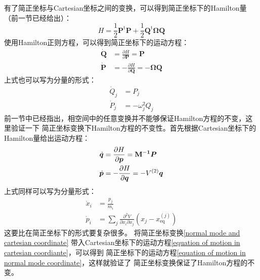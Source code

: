    \splitline

    有了简正坐标与Cartesian坐标之间的变换，可以得到简正坐标下的Hamilton量（前一节已经给出）：
    \begin{equation}
        H = \frac 12 \bm{P}^\mathrm{t}\bm{P} + \frac 12 \bm{Q}^\mathrm{t} \bm{\Omega Q}
    \end{equation}
    使用Hamilton正则方程，可以得到简正坐标下的运动方程：
    \begin{equation}
        \begin{aligned}
            \bm{\dot{Q}} &= \frac {\partial H}{\partial \bm{P}} = \bm{P}\\
            \bm{\dot{P}} &= -\frac {\partial H}{\partial \bm{Q}} = -\bm{\Omega Q}
        \end{aligned}
        \label{equation of motion in normal mode coordinate}
    \end{equation}
    上式也可以写为分量的形式：
    \begin{equation}
        \begin{aligned}
            \dot{Q}_j &= P_j\\
            \dot{P}_j &= - \omega_j^2 Q_j
        \end{aligned}
    \end{equation}
    前一节中已经指出，相空间中的任意变换并不能够保证Hamilton方程的不变，这里验证一下
    简正坐标变换下Hamilton方程的不变性。首先根据Cartesian坐标下的Hamilton量给出运动方程：
    \begin{equation}
        \begin{split}
            \dot{\bm{q}} &= \frac{\partial{H}}{\partial{\bm{p}}} = \mathbf{M^{-1}}\bm{P}\\
            \dot{\bm{p}} &= -\frac{\partial{H}}{\partial{\bm{q}}} = -V^{(2)}\bm{q}
        \end{split}
        \label{equation of motion in cartesian coordiante}
    \end{equation}
    上式同样可以写为分量形式：
    \begin{equation}
        \begin{aligned}
            \dot{x}_i &= \frac {p_j}{m_i}\\
            \dot{p}_i &= \sum_j \frac {\partial^2 V}{\partial x_i \partial x_j} (x_j - x_\mathrm{eq}^{(j)})
        \end{aligned}
    \end{equation}
    这要比在简正坐标下的形式要复杂很多。
    将简正坐标变换\ref{normal mode and cartesian coordinate}
    带入Cartesian坐标下的运动方程\ref{equation of motion in cartesian coordiante}，可以得到
    简正坐标下的运动方程\ref{equation of motion in normal mode coordinate}，这样就验证了
    简正坐标变换保证了Hamilton方程的不变。

